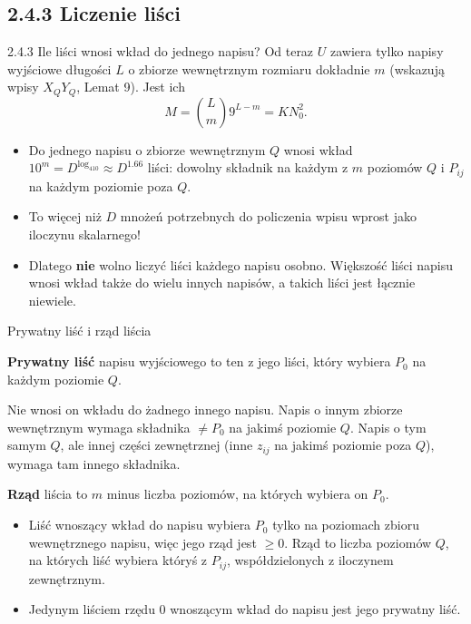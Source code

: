 \subsection{2.4.3 Liczenie liści}

\begin{frame}{2.4.3 Ile liści wnosi wkład do jednego napisu?}
  Od teraz $U$ zawiera tylko napisy wyjściowe długości $L$ o zbiorze wewnętrznym rozmiaru dokładnie $m$
  (wskazują wpisy $X_QY_Q$, Lemat 9). Jest ich
  \[M=\binom Lm9^{L-m}=KN_0^2.\]
  \pause
  \begin{itemize}
    \item Do jednego napisu o zbiorze wewnętrznym $Q$ wnosi wkład $10^m=D^{\log_410}\approx D^{1.66}$ liści: dowolny składnik na każdym z $m$ poziomów $Q$
      i $P_{ij}$ na każdym poziomie poza $Q$.
    \item<3-> To \alert{więcej niż $D$} mnożeń potrzebnych do policzenia wpisu wprost jako iloczynu skalarnego!
    \item<4-> Dlatego \textbf{nie} wolno liczyć liści każdego napisu osobno. Większość liści napisu wnosi wkład
      także do wielu innych napisów, a takich liści jest łącznie niewiele.
  \end{itemize}
\end{frame}

\begin{frame}{Prywatny liść i rząd liścia}
  \begin{definicja}
    \textbf{Prywatny liść} napisu wyjściowego to ten z jego liści, który wybiera $P_0$ na każdym poziomie $Q$.
  \end{definicja}
  Nie wnosi on wkładu do żadnego innego napisu. Napis o innym zbiorze wewnętrznym wymaga składnika $\ne P_0$ na jakimś
  poziomie $Q$. Napis o tym samym $Q$, ale innej części zewnętrznej (inne $z_{ij}$ na jakimś poziomie poza $Q$), wymaga tam innego składnika.
  \pause
  \begin{definicja}
    \textbf{Rząd} liścia to $m$ minus liczba poziomów, na których wybiera on $P_0$.
  \end{definicja}
  \begin{itemize}
    \item Liść wnoszący wkład do napisu wybiera $P_0$ tylko na poziomach zbioru wewnętrznego napisu, więc jego rząd jest $\ge0$.
      Rząd to liczba poziomów $Q$, na których liść wybiera któryś z $P_{ij}$, współdzielonych z iloczynem zewnętrznym.
    \item Jedynym liściem rzędu $0$ wnoszącym wkład do napisu jest jego prywatny liść.
  \end{itemize}
\end{frame}

